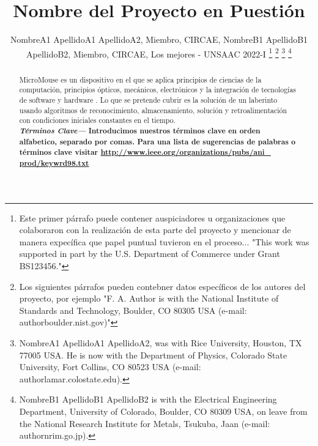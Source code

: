 \documentclass[a4paper]{IEEEtran} %
\providecommand{\keywords}[1]{\textbf{\textit{Términos Clave---}} #1}
\begin{document}

\title{Nombre del Proyecto en Puestión}
\author{NombreA1 ApellidoA1 ApellidoA2, Miembro, CIRCAE, NombreB1 ApellidoB1 ApellidoB2, Miembro, CIRCAE, Los mejores - UNSAAC 2022-I
\thanks{Este primer párrafo puede contener auspiciadores u organizaciones que colaboraron con la realización de esta parte del proyecto y mencionar de manera expecífica que papel puntual tuvieron en el proceso... "This work was supported in part by the U.S. Department of Commerce under Grant BS123456."}
\thanks{Los siguientes párrafos pueden contebner datos específicos de los autores del proyecto, por ejemplo "F. A. Author is with the National Institute of Standards and Technology, Boulder, CO 80305 USA (e-mail: author\@ boulder.nist.gov)"}
\thanks{NombreA1 ApellidoA1 ApellidoA2, was with Rice University, Houston, TX 77005 USA. He is now with the Department of Physics, Colorado State University, Fort Collins, CO 80523 USA (e-mail: author\@ lamar.colostate.edu).}
\thanks{NombreB1 ApellidoB1 ApellidoB2 is with the Electrical Engineering Department, University of Colorado, Boulder, CO 80309 USA, on leave from the National Research Institute for Metals, Tsukuba, Jaan (e-mail: author\@ nrim.go.jp).}}

\maketitle


\begin{abstract}
MicroMouse es un dispositivo en el que se aplica principios de ciencias de la computación, principios ópticos, mecánicos, electrónicos y la integración de tecnologías de software y hardware  . Lo que se pretende cubrir es la solución de un laberinto usando algoritmos de reconocimiento, almacenamiento, solución y retroalimentación con condiciones iniciales constantes en el tiempo.\\

\keywords{\textbf{Introducimos nuestros términos clave en orden alfabetico, separado por comas. Para una lista de sugerencias de palabras o términos clave visitar \underline{http://www.ieee.org/organizations/pubs/ani\_ prod/keywrd98.txt}}}
\end{abstract}

\end{document}
